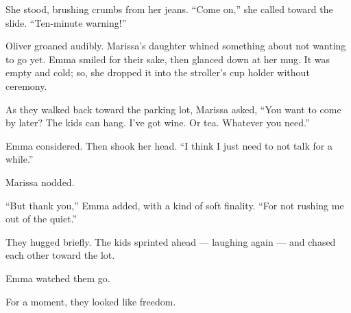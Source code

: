 She stood, brushing crumbs from her jeans. ``Come on,'' she called toward the slide. ``Ten-minute warning!''

Oliver groaned audibly. 
Marissa’s daughter whined something about not wanting to go yet. 
Emma smiled for their sake, then glanced down at her mug. 
It was empty and cold; so, she dropped it into the stroller’s cup holder without ceremony.

As they walked back toward the parking lot, Marissa asked, ``You want to come by later? The kids can hang. 
I’ve got wine. Or tea. Whatever you need.''

Emma considered. Then shook her head. ``I think I just need to not talk for a while.''

Marissa nodded.

``But thank you,'' Emma added, with a kind of soft finality. ``For not rushing me out of the quiet.''

They hugged briefly. 
The kids sprinted ahead --- laughing again --- and chased each other toward the lot.

Emma watched them go.

For a moment, they looked like freedom.

